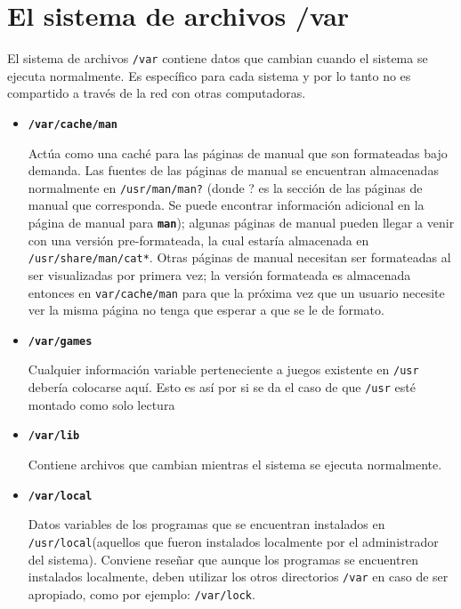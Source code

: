\documentclass[12pt]{article}
\begin{document}
\section{ El sistema de archivos /var}
    
    El sistema de archivos \texttt{/var} contiene datos que
    cambian cuando el sistema se ejecuta normalmente. Es específico para cada
    sistema y por lo tanto no es compartido a través de la red con otras
    computadoras. 

	\begin{itemize}  

	\item 
        
	\textbf{\texttt{/var/cache/man}} 
        
	 Actúa como una caché para las páginas de manual que son
	formateadas bajo demanda. Las fuentes de las páginas de manual se
	encuentran almacenadas normalmente en \texttt{/usr/man/man?}
	(donde ? es la sección de las páginas de manual que corresponda. Se
	puede 	encontrar información adicional en la página de manual para
	\texttt{\textbf{man}}); algunas páginas de manual
	pueden 	llegar a venir con una versión pre-formateada, la cual estaría
	almacenada 	en \texttt{/usr/share/man/cat*}. Otras
	páginas de manual necesitan ser formateadas al ser visualizadas por
	primera vez; la versión formateada es almacenada entonces en
	\texttt{var/cache/man} para que la próxima vez que un
	usuario necesite ver la misma página no tenga que esperar a que se le de
	formato.  

	\item 
        
	\textbf{\texttt{/var/games}} 
        
	 Cualquier información variable perteneciente a juegos
	existente en \texttt{/usr} debería colocarse aquí. Esto es
	así por si se da el caso de que \texttt{/usr} esté montado
	como 		solo lectura 

	\item 

	\textbf{\texttt{/var/lib}} 
    
	 Contiene archivos que cambian mientras el sistema se
	ejecuta normalmente. 

	\item 
        

	\textbf{\texttt{/var/local}} 
        
	 Datos variables de los programas que se encuentran
	instalados en \texttt{/usr/local}(aquellos que fueron
	instalados localmente por el administrador del sistema). Conviene
	reseñar  		que aunque los programas se encuentren
	instalados localmente, deben 			utilizar los otros
	directorios \texttt{/var} en caso de ser
	apropiado, como por ejemplo:
	\texttt{/var/lock}.  


\end{itemize}
\end{document}
